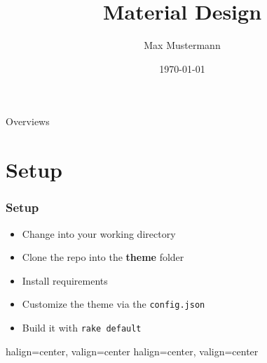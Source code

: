 \documentclass{beamer}
\title{Material Design}
\date{\today}
\author{Max Mustermann}
\begin{document}

\begin{frame}
	\titlepage
\end{frame}

{
	\begin{frame}{Overviews}
		\tableofcontents
	\end{frame}
}

\section{Setup}
\begin{frame}
	\frametitle{Setup}
	\begin{itemize}
		\item Change into your working directory
		\item Clone the repo into the \textbf{theme} folder
		\item Install requirements
		\item Customize the theme via the \texttt{config.json}
		\item Build it with \texttt{rake default}
	\end{itemize}
\end{frame}
\begin{frame}[fragile]
	{halign=center, valign=center}
	{halign=center, valign=center}
\end{frame}
\end{document}
